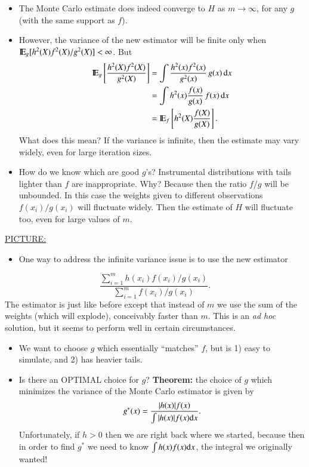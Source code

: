 \documentclass[captions=tableheading]{scrbook}
\begin{document}
\begin{itemize}
\item The Monte Carlo estimate does indeed converge to $H$ as $m \to \infty$, for any $g$ (with the same support as $f$).
\item However, the variance of the new estimator will be finite only when $\mathrm{I\hspace{-1.5pt}E}_{g}[h^{2}(X)f^{2}(X)/g^{2}(X)] < \infty$. But 
   \begin{align*}
   \mathrm{I\hspace{-1.5pt}E}_{g}\left[\frac{h^{2}(X)f^{2}(X)}{g^{2}(X)}\right] & =\int\frac{h^{2}(x)f^{2}(x)}{g^{2}(x)}\, g(x)\,\mathrm{d} x\\
   & =\int h^{2}(x)\frac{f(x)}{g(x)}\, f(x)\,\mathrm{d} x\\
   & =\mathrm{I\hspace{-1.5pt}E}_{f}\left[h^{2}(X)\frac{f(X)}{g(X)}\right].
   \end{align*}
   What does this mean? If the variance is infinite, then the estimate may vary widely, even for large iteration sizes.
\item How do we know which are good $g$'s? Instrumental distributions with tails lighter than $f$ are inappropriate. Why? Because then the ratio $f/g$ will be unbounded. In this case the weights given to different observations $f(x_{i})/g(x_{i})$ will fluctuate widely. Then the estimate of $H$ will fluctuate too, even for large values of $m$.
\end{itemize}
\underline{PICTURE:} 

\vspace{1in}


\begin{itemize}
\item One way to address the infinite variance issue is to use the new estimator
\end{itemize}
\[
\frac{\sum_{i=1}^{m}h(x_{i})f(x_{i})/g(x_{i})}{\sum_{i=1}^{m}f(x_{i})/g(x_{i})}.
\]
The estimator is just like before except that instead of $m$ we use the sum of the weights (which will explode), conceivably faster than $m$. This is an \emph{ad hoc} solution, but it seems to perform well in certain circumstances. 


\begin{itemize}
\item We want to choose $g$ which essentially ``matches'' $f$, but is 1) easy to simulate, and 2) has heavier tails.
\item Is there an OPTIMAL choice for $g$? \textbf{Theorem:} the choice of $g$ which minimizes the variance of the Monte Carlo estimator is given by 
   \[
   g^{\ast}(x)=\frac{|h(x)|f(x)}{\int|h(x)|f(x)\mathrm{d} x}.
   \]
   Unfortunately, if $h > 0$ then we are right back where we started, because then in order to find $g^{\ast}$ we need to know $\int h(x)f(x)\mathrm{d} x$, the integral we originally wanted!
\end{itemize}
\end{document}
